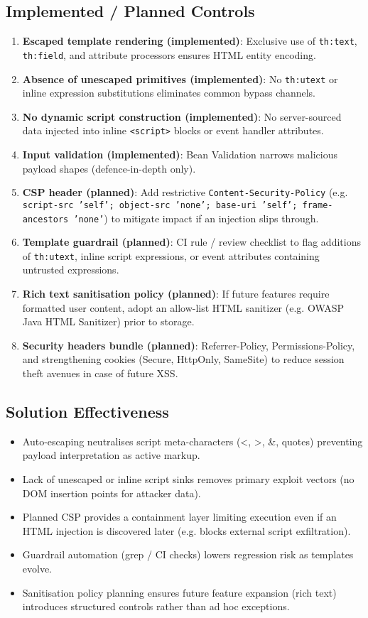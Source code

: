 \documentclass[]{UCD_CS_FYP_Report}
\begin{document}
\subsection*{Implemented / Planned Controls}
\begin{enumerate}
 \item \textbf{Escaped template rendering (implemented)}: Exclusive use of \texttt{th:text}, \texttt{th:field}, and attribute processors ensures HTML entity encoding.
 \item \textbf{Absence of unescaped primitives (implemented)}: No \texttt{th:utext} or inline expression substitutions eliminates common bypass channels.
 \item \textbf{No dynamic script construction (implemented)}: No server-sourced data injected into inline \texttt{<script>} blocks or event handler attributes.
 \item \textbf{Input validation (implemented)}: Bean Validation narrows malicious payload shapes (defence-in-depth only).
 \item \textbf{CSP header (planned)}: Add restrictive \texttt{Content-Security-Policy} (e.g. \texttt{script-src 'self'; object-src 'none'; base-uri 'self'; frame-ancestors 'none'}) to mitigate impact if an injection slips through.
 \item \textbf{Template guardrail (planned)}: CI rule / review checklist to flag additions of \texttt{th:utext}, inline script expressions, or event attributes containing untrusted expressions.
 \item \textbf{Rich text sanitisation policy (planned)}: If future features require formatted user content, adopt an allow-list HTML sanitizer (e.g. OWASP Java HTML Sanitizer) prior to storage.
 \item \textbf{Security headers bundle (planned)}: Referrer-Policy, Permissions-Policy, and strengthening cookies (Secure, HttpOnly, SameSite) to reduce session theft avenues in case of future XSS.
\end{enumerate}

\subsection*{Solution Effectiveness}
\begin{itemize}
 \item Auto-escaping neutralises script meta-characters (<, >, \&, quotes) preventing payload interpretation as active markup.
 \item Lack of unescaped or inline script sinks removes primary exploit vectors (no DOM insertion points for attacker data).
 \item Planned CSP provides a containment layer limiting execution even if an HTML injection is discovered later (e.g. blocks external script exfiltration).
 \item Guardrail automation (grep / CI checks) lowers regression risk as templates evolve.
 \item Sanitisation policy planning ensures future feature expansion (rich text) introduces structured controls rather than ad hoc exceptions.
\end{itemize}
\end{document}
